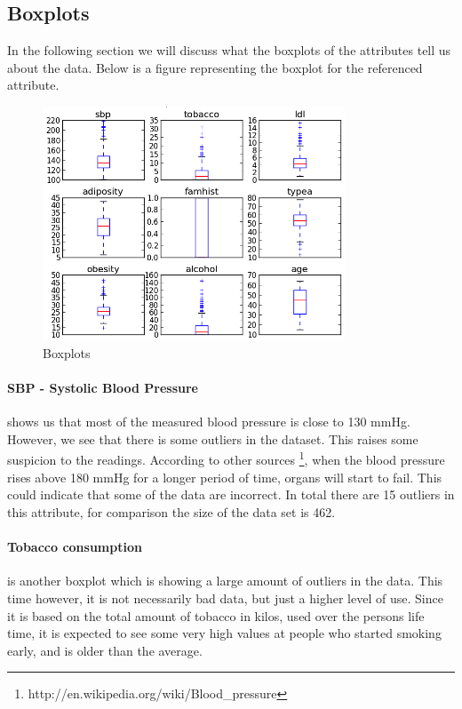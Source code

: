 \subsection{Boxplots}
\label{boxplotSection}
In the following section we will discuss what the boxplots of the attributes tell us about the data.
Below is a figure representing the boxplot for the referenced attribute.
\begin{figure}[H]
\centering
\includegraphics[width=9cm, keepaspectratio=true]{pictures/boxplot.png}
\caption{\footnotesize Boxplots}
\vspace{-.5cm}
\label{boxplot}
\end{figure}
\paragraph{SBP - Systolic Blood Pressure} shows us that most of the measured blood pressure is close to 130 mmHg. However, we see that there is some outliers in the dataset. This raises some suspicion to the readings. According to other sources \footnote{http://en.wikipedia.org/wiki/Blood\_pressure}, when the blood pressure rises above 180 mmHg for a longer period of time, organs will start to fail. This could indicate that some of the data are incorrect.
In total there are 15 outliers in this attribute, for comparison the size of the data set is 462.

\paragraph{Tobacco consumption} is another boxplot which is showing a large amount of outliers in the data. This time however, it is not necessarily bad data, but just a higher level of use. Since it is based on the total amount of tobacco in kilos, used over the persons life time, it is expected to see some very high values at people who started smoking early, and is older than the average.

